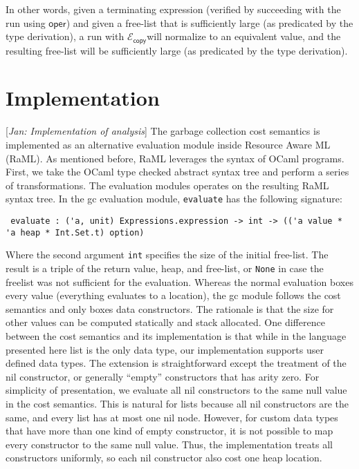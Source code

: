 \documentclass{easychair}
\newcommand{\ms}[1]{\ensuremath{\mathsf{#1}}}
\newcommand{\jan}[1]{{\color{red} [\emph{Jan: #1}]}}
\newcommand{\copySem}{\ensuremath{\mathcal{E}_{\ms{copy}}}}
\theoremstyle{definition}
\begin{document}
In other words, given a terminating expression (verified by succeeding with the run using \ms{oper})
and given a free-list that is sufficiently large (as predicated by the type derivation), 
a run with \copySem will normalize to an equivalent value, and the resulting free-list 
will be sufficiently large (as predicated by the type derivation).






\section{Implementation}
\label{sect:implementation}

\jan{Implementation of analysis}
The garbage collection cost semantics is implemented as an alternative evaluation module inside
Resource Aware ML (RaML). As mentioned before, RaML leverages the syntax of OCaml programs. 
First, we take the OCaml type checked abstract syntax tree and perform a series of transformations. 
The evaluation modules operates on the resulting RaML syntax tree. 
In the gc evaluation module, \texttt{evaluate} has the following signature:

\begin{verbatim}
 evaluate : ('a, unit) Expressions.expression -> int -> (('a value * 'a heap * Int.Set.t) option) 
\end{verbatim}

Where the second argument \texttt{int} specifies the size of the initial free-list.
The result is a triple of the return value, heap, and free-list, or \texttt{None} 
in case the freelist was not sufficient for the evaluation.
Whereas the normal evaluation boxes every value (everything evaluates to a location), 
the gc module follows the cost semantics and only boxes data constructors. The rationale is
that the size for other values can be computed statically and stack allocated. One difference
between the cost semantics and its implementation is that while in the language presented here
list is the only data type, our implementation supports user defined data types. The extension
is straightforward except the treatment of the nil constructor, or generally ``empty'' constructors
that has arity zero. For simplicity of presentation, we evaluate all nil constructors to
the same null value in the cost semantics. This is natural for lists because all nil constructors 
are the same, and every list has at most one nil node. However, for custom data types that have 
more than one kind of empty constructor, it is not possible to map every constructor to the same 
null value. Thus, the implementation treats all constructors uniformly, so each nil constructor
also cost one heap location. 
\end{document}
